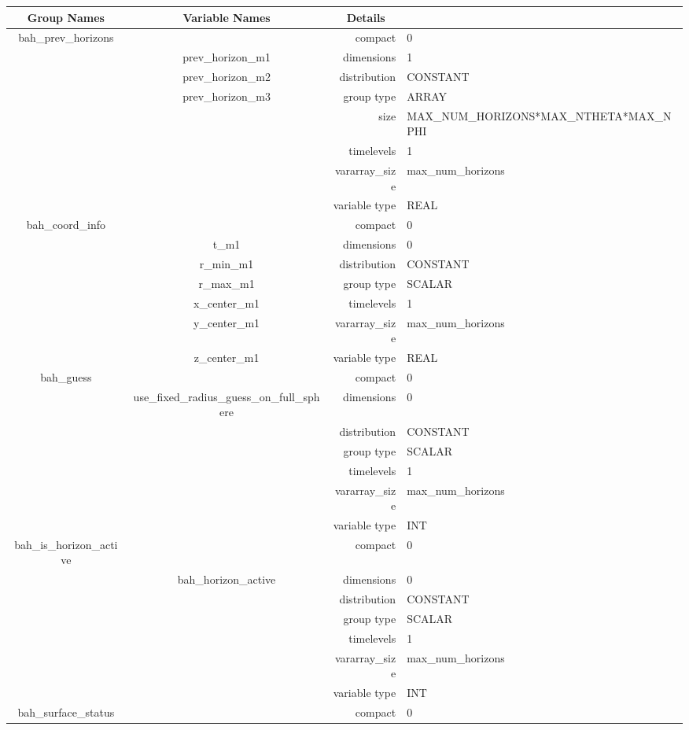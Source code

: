\begin{tabular*}{150mm}{|c|c@{\extracolsep{\fill}}|rl|} \hline 
~ {\bf Group Names} ~ & ~ {\bf Variable Names} ~  &{\bf Details} ~ & ~\\ 
\hline 
bah\_prev\_horizons &  & compact & 0 \\ 
 & prev\_horizon\_m1 & dimensions & 1 \\ 
 & prev\_horizon\_m2 & distribution & CONSTANT \\ 
 & prev\_horizon\_m3 & group type & ARRAY \\ 
 &  & size & MAX\_NUM\_HORIZONS*MAX\_NTHETA*MAX\_NPHI \\ 
 &  & timelevels & 1 \\ 
 &  & vararray\_size & max\_num\_horizons \\ 
 &  & variable type & REAL \\ 
\hline 
bah\_coord\_info &  & compact & 0 \\ 
 & t\_m1 & dimensions & 0 \\ 
 & r\_min\_m1 & distribution & CONSTANT \\ 
 & r\_max\_m1 & group type & SCALAR \\ 
 & x\_center\_m1 & timelevels & 1 \\ 
 & y\_center\_m1 & vararray\_size & max\_num\_horizons \\ 
 & z\_center\_m1 & variable type & REAL \\ 
\hline 
bah\_guess &  & compact & 0 \\ 
 & use\_fixed\_radius\_guess\_on\_full\_sphere & dimensions & 0 \\ 
 &  & distribution & CONSTANT \\ 
 &  & group type & SCALAR \\ 
 &  & timelevels & 1 \\ 
 &  & vararray\_size & max\_num\_horizons \\ 
 &  & variable type & INT \\ 
\hline 
bah\_is\_horizon\_active &  & compact & 0 \\ 
 & bah\_horizon\_active & dimensions & 0 \\ 
 &  & distribution & CONSTANT \\ 
 &  & group type & SCALAR \\ 
 &  & timelevels & 1 \\ 
 &  & vararray\_size & max\_num\_horizons \\ 
 &  & variable type & INT \\ 
\hline 
bah\_surface\_status &  & compact & 0 \\ 

\end{tabular*}
